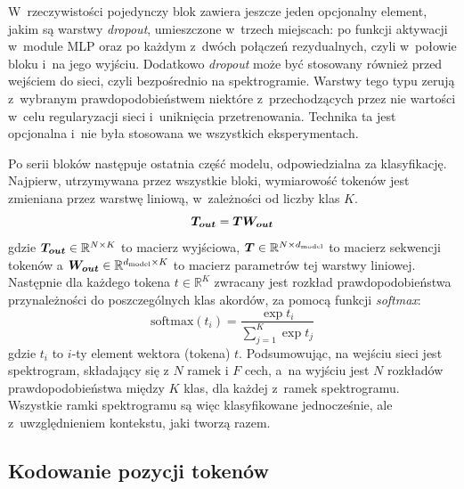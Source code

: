 W~rzeczywistości pojedynczy blok zawiera jeszcze jeden opcjonalny element, jakim są warstwy \emph{dropout}, umieszczone w~trzech miejscach: po funkcji aktywacji w~module MLP oraz po każdym z~dwóch połączeń rezydualnych, czyli w~połowie bloku i~na jego wyjściu. Dodatkowo \emph{dropout} może być stosowany również przed wejściem do sieci, czyli bezpośrednio na spektrogramie. Warstwy tego typu zerują z~wybranym prawdopodobieństwem niektóre z~przechodzących przez nie wartości w~celu regularyzacji sieci i~uniknięcia przetrenowania. Technika ta jest opcjonalna i~nie była stosowana we wszystkich eksperymentach.

Po serii bloków następuje ostatnia część modelu, odpowiedzialna za klasyfikację. Najpierw, utrzymywana przez wszystkie bloki, wymiarowość tokenów jest zmieniana przez warstwę liniową, w~zależności od liczby klas $K$.
\begin{equation}
    \boldsymbol{T_{out}} = \boldsymbol{T} \boldsymbol{W_{out}}
\end{equation}
gdzie $\boldsymbol{T_{out}} \in \mathbb{R}^{N \times K}$ to macierz wyjściowa, $\boldsymbol{T} \in \mathbb{R}^{N \times d_{\mathrm{model}}}$ to macierz sekwencji tokenów a $\boldsymbol{W_{out}} \in \mathbb{R}^{d_{\mathrm{model}} \times K}$ to macierz parametrów tej warstwy liniowej. Następnie dla każdego tokena $t \in \mathbb{R}^K$ zwracany jest rozkład prawdopodobieństwa przynależności do poszczególnych klas akordów, za pomocą funkcji \emph{softmax}:
\begin{equation}
    \textrm{softmax}(t_i) = \frac{\exp{t_i}}{\sum_{j=1}^{K}\exp{t_j}}
\end{equation}
gdzie $t_i$ to $i$-ty element wektora (tokena) $t$. Podsumowując, na wejściu sieci jest spektrogram, składający się z $N$ ramek i $F$ cech, a~na wyjściu jest $N$ rozkładów prawdopodobieństwa między $K$ klas, dla każdej z~ramek spektrogramu. Wszystkie ramki spektrogramu są więc klasyfikowane jednocześnie, ale z~uwzględnieniem kontekstu, jaki tworzą razem.

\subsection{Kodowanie pozycji tokenów}

